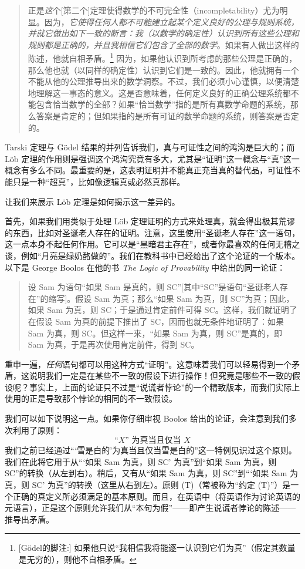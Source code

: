 \begin{quote}
正是\emph{这}个[第二个]定理使得数学的不可完全性（incompletability）尤为明显。因为，\emph{它使得任何人都不可能建立起某个定义良好的公理与规则系统，并就它做出如下一致的断言：我（以数学的确定性）认识到所有这些公理和规则都是正确的，并且我相信它们包含了全部的数学}。如果有人做出这样的陈述，他就自相矛盾。\footnote{[Gödel的脚注:] 如果他只说“我相信我将能逐一认识到它们为真”（假定其数量是无穷的），则他不自相矛盾。} 因为，如果他认识到所考虑的那些公理是正确的，那么他也就（以同样的确定性）认识到它们是一致的。因此，他就拥有一个不能从他的公理推导出来的数学洞察。不过，我们必须小心谨慎，以便清楚地理解这一事态的意义。这是否意味着，任何定义良好的正确公理系统都不能包含恰当数学的全部？如果“恰当数学”指的是所有真数学命题的系统，那么答案是肯定的；但如果指的是所有可证的数学命题的系统，则答案是否定的。 \citep[p.~309]{Godel1951}
\end{quote}

Tarski 定理与 Gödel 结果的并列告诉我们，真与可证性之间的鸿沟是巨大的；而 Löb 定理的作用则是强调这个鸿沟究竟有多大，尤其是“证明”这一概念与“真”这一概念有多么不同。最重要的是，这表明证明并不能真正充当真的替代品，可证性不能只是一种“超真”，比如像逻辑真或必然真那样。

让我们来展示 Löb 定理是如何揭示这一差异的。

首先，如果我们用类似于处理 Löb 定理证明的方式来处理真，就会得出极其荒谬的东西，比如对圣诞老人存在的证明。注意，这里使用“圣诞老人存在”这一语句，这一点本身不起任何作用。它可以是“黑暗君主存在”，或者你最喜欢的任何无稽之谈，例如“月亮是绿奶酪做的”。我们在教科书中已经给出了这个论证的一个版本。以下是 George Boolos 在他的书 \emph{The Logic of Provability} 中给出的同一论证：

\begin{quote}
设 Sam 为语句“如果 Sam 是真的，则 SC”[其中“SC”是语句“圣诞老人存在”的缩写]。假设 Sam 为真；那么“如果 Sam 为真，则 SC”为真；因此，如果 Sam 为真，则 SC；于是通过肯定前件可得 SC。这样，我们就证明了在假设 Sam 为真的前提下推出了 SC，因而也就无条件地证明了：如果 Sam 为真，则 SC。但这样一来，“如果 Sam 为真，则 SC”是真的，即 Sam 为真，于是再次使用肯定前件，得到 SC。 \citep[p.~56]{Boolos1993}
\end{quote}


重申一遍，\emph{任何}语句都可以用这种方式“证明”。这意味着我们可以轻易得到一个矛盾，这说明我们一定是在某些不一致的假设下进行操作！但究竟是哪些不一致的假设呢？事实上，上面的论证只不过是“说谎者悖论”的一个精致版本，而我们实际上使用的正是导致那个悖论的相同的不一致假设。

我们可以如下说明这一点。如果你仔细审视 Boolos 给出的论证，会注意到我们多次利用了原则：
\begin{equation*}\label{eqn:convention-t}
\text{“$X$” 为真当且仅当 $X$}\tag{T}
\end{equation*}
我们之前已经通过“‘雪是白的’为真当且仅当雪是白的”这一特例见识过这个原则。我们在此将它用于从“‘如果 Sam 为真，则 SC’ 为真”到“如果 Sam 为真，则 SC”的转换（从左到右）。稍后，又有从“如果 Sam 为真，则 SC”到“‘如果 Sam 为真，则 SC’ 为真”的转换（这里从右到左）。原则 (T)（常被称为“约定 (T)”）是一个正确的真定义所必须满足的基本原则。而且，在英语中（将英语作为讨论英语的元语言），正是这个原则允许我们从“本句为假”——即产生说谎者悖论的陈述——推导出矛盾。

